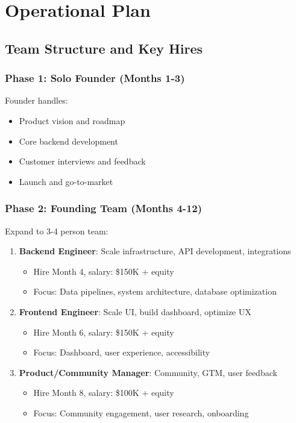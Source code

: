 \documentclass{report}
\begin{document}
\newpage

\chapter{Operational Plan}

\section{Team Structure and Key Hires}

\subsection{Phase 1: Solo Founder (Months 1-3)}

Founder handles:
\begin{itemize}
    \item Product vision and roadmap
    \item Core backend development
    \item Customer interviews and feedback
    \item Launch and go-to-market
\end{itemize}

\subsection{Phase 2: Founding Team (Months 4-12)}

Expand to 3-4 person team:

\begin{enumerate}
    \item \textbf{Backend Engineer}: Scale infrastructure, API development, integrations
    \begin{itemize}
        \item Hire Month 4, salary: \$150K + equity
        \item Focus: Data pipelines, system architecture, database optimization
    \end{itemize}
    
    \item \textbf{Frontend Engineer}: Scale UI, build dashboard, optimize UX
    \begin{itemize}
        \item Hire Month 6, salary: \$150K + equity
        \item Focus: Dashboard, user experience, accessibility
    \end{itemize}
    
    \item \textbf{Product/Community Manager}: Community, GTM, user feedback
    \begin{itemize}
        \item Hire Month 8, salary: \$100K + equity
        \item Focus: Community engagement, user research, onboarding
    \end{itemize}
\end{enumerate}
\end{document}

